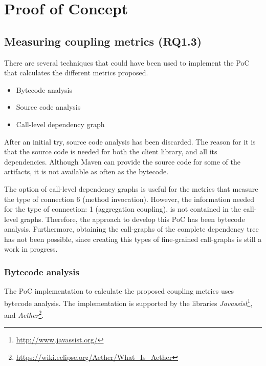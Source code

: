 \chapter{Proof of Concept}\label{ch:PoC}


\section{Measuring coupling metrics (RQ1.3)}
There are several techniques that could have been used to implement the PoC that calculates the different metrics proposed.

\begin{itemize}
  \item Bytecode analysis
  \item Source code analysis
  \item Call-level dependency graph
\end{itemize}

After an initial try, source code analysis has been discarded. The reason for it is that the source code is needed for both the client library, and all its dependencies. Although Maven can provide the source code for some of the artifacts, it is not available as often as the bytecode.

The option of call-level dependency graphs is useful for the metrics that measure the type of connection 6 (method invocation). However, the information needed for the type of connection: 1 (aggregation coupling), is not contained in the call-level graphs. Therefore, the approach to develop this PoC has been bytecode analysis. Furthermore, obtaining the call-graphs of the complete dependency tree has not been possible, since creating this types of fine-grained call-graphs is still a work in progress.

\subsection{Bytecode analysis}
The PoC implementation to calculate the proposed coupling metrics uses bytecode analysis. The implementation is supported by the libraries \textit{Javassist}\footnote{\url{http://www.javassist.org/}}, and \textit{Aether}\footnote{\url{https://wiki.eclipse.org/Aether/What_Is_Aether}}.

